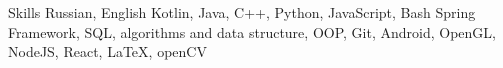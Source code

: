 \begin{rubric}{Skills}
    Russian, English
	Kotlin, Java, C++, Python, JavaScript, Bash
    Spring Framework, SQL, algorithms and data structure, OOP, Git, Android, OpenGL, NodeJS, React, \LaTeX, openCV
\end{rubric}